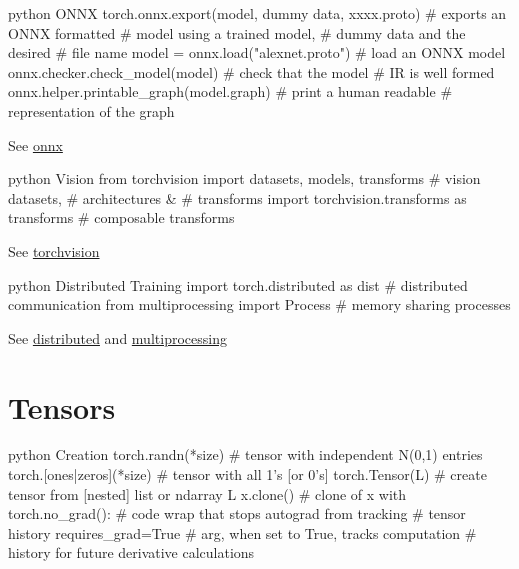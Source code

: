 \documentclass[8pt]{extarticle}
\begin{document}
\begin{multicols}{2}
\begin{codebox}{python}{\hypertarget{onnx}{%
ONNX\label{onnx}}}
torch.onnx.export(model, dummy data, xxxx.proto)    # exports an ONNX formatted 
                                                    # model using a trained model, 
                                                    # dummy data and the desired 
                                                    # file name
model = onnx.load("alexnet.proto")                  # load an ONNX model
onnx.checker.check_model(model)                     # check that the model
                                                    # IR is well formed
onnx.helper.printable_graph(model.graph)            # print a human readable
                                                    # representation of the graph
\end{codebox}

See \href{https://pytorch.org/docs/stable/onnx.html}{onnx}

\begin{codebox}{python}{\hypertarget{vision}{%
Vision\label{vision}}}
from torchvision import datasets, models, transforms    # vision datasets,
                                                        # architectures &
                                                        # transforms
import torchvision.transforms as transforms             # composable transforms
\end{codebox}

See
\href{https://pytorch.org/docs/stable/torchvision/index.html}{torchvision}

\begin{codebox}{python}{\hypertarget{distributed-training}{%
Distributed Training\label{distributed-training}}}
import torch.distributed as dist          # distributed communication
from multiprocessing import Process       # memory sharing processes
\end{codebox}

See \href{https://pytorch.org/docs/stable/distributed.html}{distributed}
and
\href{https://pytorch.org/docs/stable/multiprocessing.html}{multiprocessing}

\hypertarget{tensors}{%
\section{Tensors}\label{tensors}}

\begin{codebox}{python}{\hypertarget{creation}{%
Creation\label{creation}}}
torch.randn(*size)          # tensor with independent N(0,1) entries
torch.[ones|zeros](*size)   # tensor with all 1's [or 0's]
torch.Tensor(L)             # create tensor from [nested] list or ndarray L
x.clone()                   # clone of x
with torch.no_grad():       # code wrap that stops autograd from tracking 
                            # tensor history
requires_grad=True          # arg, when set to True, tracks computation
                            # history for future derivative calculations
\end{codebox}


\end{multicols}
\end{document}
